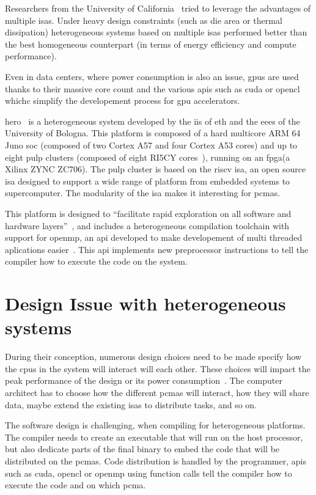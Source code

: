 Researchers from the University of California~\cite{Art:Harnessing} tried to leverage the advantages of multiple \glspl{isa}. Under heavy design constraints (such as die area or thermal dissipation) heterogeneous systems based on multiple \glspl{isa} performed better than the best homogeneous counterpart (in terms of energy efficiency and compute performance). 


Even in data centers, where power consumption is also an issue, \glspl{gpu} are used thanks to their massive core count and the various \glspl{api} such as \gls{cuda} or \gls{opencl} whichc simplify the developement process for \gls{gpu} accelerators.

    \gls{hero}~\cite{Art:Hero} is a heterogeneous system developed by the \gls{iis} of \acrshort{eth} and the \gls{eees} of the University of Bologna. This platform is composed of a hard multicore ARM 64 Juno \gls{soc} (composed of two Cortex A57 and four Cortex A53 cores) and up to eight \gls{pulp} clusters (composed of eight RI5CY cores~\cite{Art:Hero}), running on an \gls{fpga}(a Xilinx ZYNC ZC706).
    The \gls{pulp} cluster is based on the \gls{riscv} \gls{isa}, an open source \gls{isa} designed to support a wide range of platform from embedded systems to supercomputer. The modularity of the \gls{isa} makes it interesting for \glspl{pcma}.

    This platform is designed to ``facilitate rapid exploration on all software and hardware layers''~\cite{Art:Hero}, and includes a heterogeneous compilation toolchain with support for \gls{openmp}, an \gls{api} developed to make developement of multi threaded aplications easier~\cite{Web:Wiki_OpenMP}. This \gls{api} implements new preprocessor instructions to tell the compiler how to execute the code on the system.



\section {Design Issue with heterogeneous systems}
    During their conception, numerous design choices need to be made specify how the \glspl{cpu} in the system will interact will each other. These choices will impact the peak performance of the design or its power consumption~\cite{Art:Harnessing}. The computer architect has to choose how the different \glspl{pcma} will interact, how they will share data, maybe extend the existing \glspl{isa} to distribute tasks, and so on.

    The software design is challenging, when compiling for heterogeneous platforms. The compiler needs to create an executable that will run on the host processor, but also dedicate parts of the final binary to embed the code that will be distributed on the \glspl{pcma}. Code distribution is handled by the programmer, \glspl{api} such as \gls{cuda}, \gls{opencl} or \gls{openmp} using function calls tell the compiler how to execute the code and on which \gls{pcma}.


